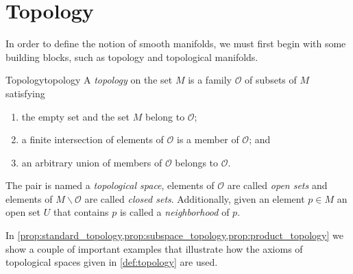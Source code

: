 \section{Topology}
In order to define the notion of smooth manifolds, we must first begin with some building blocks, such as topology and topological manifolds.

\begin{definition}{Topology}{topology}
    A \emph{topology} on the set \(M\) is a family \(\mathcal{O}\) of subsets of \(M\) satisfying
    \begin{enumerate}[label=(\alph*)]
        \item the empty set and the set \(M\) belong to \(\mathcal{O}\);
        \item a finite intersection of elements of \(\mathcal{O}\) is a member of \(\mathcal{O}\); and
        \item an arbitrary union of members of \(\mathcal{O}\) belongs to \(\mathcal{O}\).
    \end{enumerate}

    The pair  is named a \emph{topological space}, elements of \(\mathcal{O}\) are called \emph{open sets} and elements of \(M\smallsetminus\mathcal{O}\) are called \emph{closed sets}. Additionally, given an element \(p \in M\) an open set \(U\) that contains \(p\) is called a \emph{neighborhood} of \(p\).
\end{definition}

In \cref{prop:standard_topology,prop:subspace_topology,prop:product_topology} we show a couple of important examples that illustrate how the axioms of topological spaces given in \cref{def:topology} are used.

